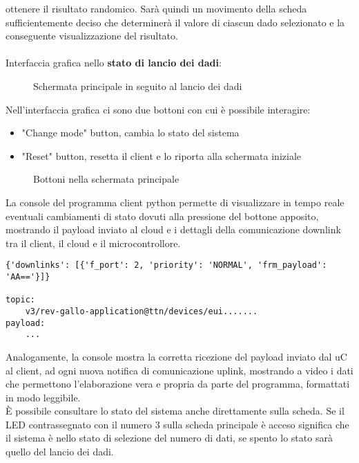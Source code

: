 ottenere il risultato randomico. Sarà quindi un movimento della scheda sufficientemente deciso che determinerà il valore di ciascun dado selezionato
e la conseguente visualizzazione del risultato.
\\\\Interfaccia grafica nello \textbf{stato di lancio dei dadi}:
\begin{figure}[H]
    \centering
    \caption{Schermata principale in seguito al lancio dei dadi}
    \label{fig:RollStateON}
\end{figure}
Nell'interfaccia grafica ci sono due bottoni con cui è possibile interagire:
\begin{itemize}
    \item "Change mode" button, cambia lo stato del sistema
    \item "Reset" button, resetta il client e lo riporta alla schermata iniziale
\end{itemize}
\begin{figure}[h!]
    \centering
    \caption{Bottoni nella schermata principale}
    \label{fig:HomePageButtons}
\end{figure}

\newpage La console del programma client python permette di visualizzare in tempo reale eventuali cambiamenti di stato dovuti alla pressione del bottone apposito, 
mostrando il payload inviato al cloud e i dettagli della comunicazione downlink tra il client, il cloud e il microcontrollore.

\begin{verbatim}
{'downlinks': [{'f_port': 2, 'priority': 'NORMAL', 'frm_payload': 'AA=='}]}

topic:
    v3/rev-gallo-application@ttn/devices/eui.......
payload:
    ...
\end{verbatim}

Analogamente, la console mostra la corretta ricezione del payload inviato dal uC al client, ad ogni nuova notifica di comunicazione uplink, 
mostrando a video i dati che permettono l'elaborazione vera e propria da parte del programma, formattati in modo leggibile.\\

È possibile consultare lo stato del sistema anche direttamente sulla scheda. Se il LED contrassegnato con il numero 3 sulla scheda principale 
è acceso significa che il sistema è nello stato di selezione del numero di dati, se spento lo stato sarà quello del lancio dei dadi.












